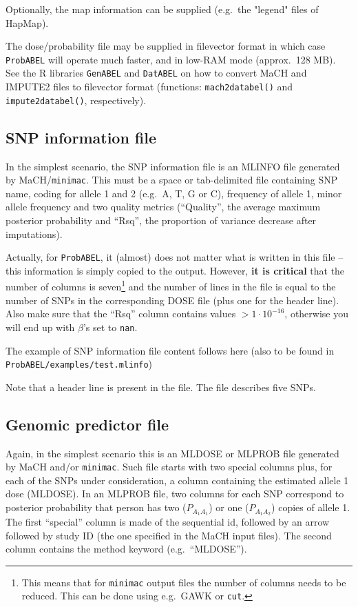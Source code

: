 \documentclass[12pt,a4paper]{article}
\newcommand{\PA}{\texttt{ProbABEL}}
\newcommand{\GA}{\texttt{GenABEL}}
\newcommand{\DA}{\texttt{DatABEL}}
\begin{document}
Optionally, the map information can be supplied (e.g.~the "legend"
files of HapMap).

The dose/probability file may be supplied in filevector format
in which case \PA{} will operate much faster, and
in low-RAM mode (approx.~128 MB). See the R libraries \GA{} and
\DA{} on how to convert MaCH and IMPUTE2 files to
filevector format (functions: \texttt{mach2databel()} and
\texttt{impute2databel()}, respectively).

\subsection{SNP information file}
\label{ssec:infoin}
In the simplest scenario, the SNP information file is an MLINFO
file generated by MaCH/\texttt{minimac}. This must be a space or tab-delimited file
containing SNP name, coding for allele 1 and 2 (e.g.~A, T, G or C),
frequency of allele 1, minor allele frequency and two quality
metrics (``Quality'', the average maximum posterior probability and
``Rsq'', the proportion of variance decrease after imputations).

Actually, for \PA{}, it (almost) does not matter what is written in
this file -- this information is simply copied to the output. However,
\textbf{it is critical} that the number of columns is
seven\footnote{This means that for \texttt{minimac} output files the
  number of columns needs to be reduced. This can be done using
  e.g.~GAWK or \texttt{cut}.} and the number of lines in the file is
equal to the number of SNPs in the corresponding DOSE file (plus one
for the header line). Also make sure that the ``Rsq'' column contains
values $>1 \cdot 10^{-16}$, otherwise you will end up with $\beta$'s
set to \texttt{nan}.

The example of SNP information file content follows here (also
to be found in \texttt{ProbABEL/examples/test.mlinfo})


Note that a header line is present in the file. The file describes
five SNPs.

\subsection{Genomic predictor file}
\label{ssec:dosein}

Again, in the simplest scenario this is an MLDOSE or MLPROB file
generated by MaCH and/or \texttt{minimac}.  Such file starts with two
special columns plus, for each of the SNPs under consideration, a
column containing the estimated allele 1 dose (MLDOSE).  In an MLPROB
file, two columns for each SNP correspond to posterior probability
that person has two ($P_{A_1A_1}$) or one ($P_{A_1A_2}$) copies of
allele 1.  The first ``special'' column is made of the sequential id,
followed by an arrow followed by study ID (the one specified in the
MaCH input files). The second column contains the method keyword
(e.g.~``MLDOSE'').
\end{document}

